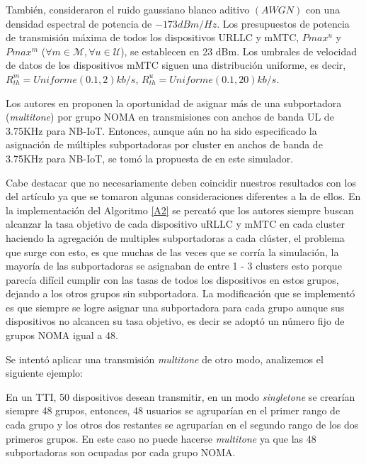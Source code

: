 También, consideraron el ruido gaussiano blanco aditivo $(AWGN)$ con una densidad espectral de potencia de $-173 dBm / Hz$. Los presupuestos de potencia de transmisión máxima de todos los dispositivos URLLC y mMTC, $Pmax ^{u}$ y $Pmax ^{m}$ ($\forall m \in \mathcal {M} , \forall u \in \mathcal {U}$), se establecen en 23 dBm. Los umbrales de velocidad de datos de los dispositivos mMTC siguen una distribución uniforme, es decir, $R_{th}^{ m} = Uniforme (0.1, 2) kb / s$, $R_{th}^{u} = Uniforme (0.1, 20) kb / s$.\newline

Los autores en \parencite{Shahini2019} proponen la oportunidad de asignar más de una subportadora (\textit{multitone}) por grupo NOMA en transmisiones con anchos de banda UL de 3.75KHz para NB-IoT. Entonces, aunque aún no ha sido especificado la asignación de múltiples subportadoras por cluster en anchos de banda de 3.75KHz para NB-IoT, se tomó la propuesta de \parencite{Shahini2019} en este simulador. \newline

Cabe destacar que no necesariamente deben coincidir nuestros resultados con los del artículo ya que se tomaron algunas consideraciones diferentes a la de ellos. En la implementación del Algoritmo \ref{A2} se percató que los autores \parencite{Shahini2019} siempre buscan alcanzar la tasa objetivo de cada dispositivo uRLLC y mMTC en cada cluster haciendo la agregación de multiples subportadoras a cada clúster, el problema que surge con esto, es que muchas de las veces que se corría la simulación, la mayoría de las subportadoras se asignaban de entre 1 - 3 clusters esto porque parecía difícil cumplir con las tasas de todos los dispositivos en estos grupos, dejando a los otros grupos sin subportadora. La modificación que se implementó es que siempre se logre asignar una subportadora para cada grupo aunque sus dispositivos no alcancen su tasa objetivo, es decir se adoptó un número fijo de grupos NOMA igual a 48. \newline

Se intentó aplicar una transmisión \textit{multitone} de otro modo, analizemos el siguiente ejemplo: \newline

En un TTI, 50 dispositivos desean transmitir, en un modo \textit{singletone} se crearían siempre 48 grupos, entonces, 48 usuarios se agruparían en el primer rango de cada grupo y los otros dos restantes se agruparían en el segundo rango de los dos primeros grupos. En este caso no puede hacerse \textit{multitone} ya que las 48 subportadoras son ocupadas por cada grupo NOMA. \newline

